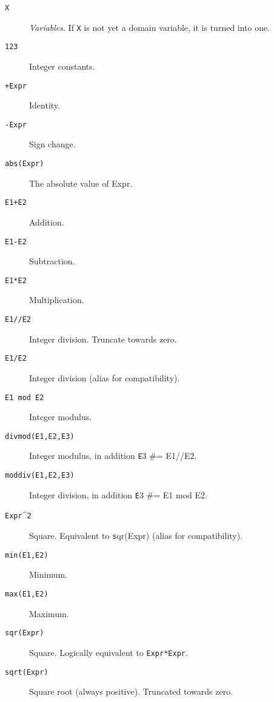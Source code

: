 \begin{description}
\item[\texttt{X}]
	    \emph{Variables}.  If \verb'X' is not yet a domain variable, it is turned 
	    into one.

   \item[\texttt{123}]
	    Integer constants.

   \item[\texttt{+Expr}]
	    Identity.

   \item[\texttt{-Expr}]
	    Sign change.

\item[\texttt{abs(Expr)}]
    The absolute value of Expr.

\item[\texttt{E1+E2}]
    Addition.

\item[\texttt{E1-E2}]
    Subtraction.

\item[\texttt{E1*E2}]
    Multiplication.

\item[\texttt{E1//E2}]
    Integer division. Truncate towards zero.

\item[\texttt{E1/E2}]
    Integer division (alias for compatibility).

\item[\texttt{E1 mod E2}]
	    Integer modulus.

\item[\texttt{divmod(E1,E2,E3)}]
	    Integer modulus, in addition {\texttt E3 \#= E1//E2}.

\item[\texttt{moddiv(E1,E2,E3)}]
	    Integer division, in addition {\texttt E3 \#= E1 mod E2}.

\item[\texttt{Expr}\textasciicircum{}{\texttt 2}]
	    Square. Equivalent to {\texttt sqr(Expr)} (alias for compatibility).


\item[\texttt{min(E1,E2)}]
    Minimum.

\item[\texttt{max(E1,E2)}]
    Maximum.

\item[\texttt{sqr(Expr)}]
    Square. Logically equivalent to \verb|Expr*Expr|.

\item[\texttt{sqrt(Expr)}]
	    Square root (always positive). Truncated towards zero.


\end{description}
